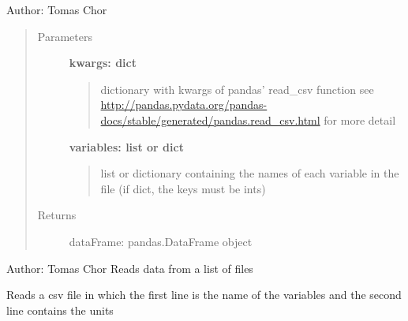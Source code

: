 \documentclass[a4paper,10pt,english]{sphinxmanual}
\begin{document}
\begin{fulllineitems}
\label{pymicra:pymicra.io.readDataFile}
Author: Tomas Chor
\begin{quote}\begin{description}
\item[{Parameters}] \leavevmode
\textbf{kwargs: dict}
\begin{quote}

dictionary with kwargs of pandas' read\_csv function
see \url{http://pandas.pydata.org/pandas-docs/stable/generated/pandas.read\_csv.html} for more detail
\end{quote}

\textbf{variables: list or dict}
\begin{quote}

list or dictionary containing the names of each variable in the file (if dict, the keys must be ints)
\end{quote}

\item[{Returns}] \leavevmode
dataFrame: pandas.DataFrame object

\end{description}\end{quote}

\end{fulllineitems}


\begin{fulllineitems}
\label{pymicra:pymicra.io.readDataFiles}
Author: Tomas Chor
Reads data from a list of files

\end{fulllineitems}


\begin{fulllineitems}
\label{pymicra:pymicra.io.readUnitsCsv}
Reads a csv file in which the first line is the name of the variables
and the second line contains the units

\end{fulllineitems}
\end{document}
